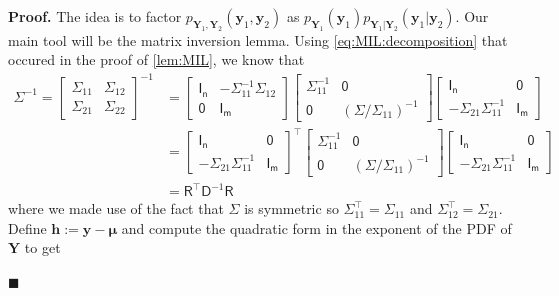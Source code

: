 \documentclass[10pt]{article}
\theoremstyle{definition}
\newenvironment{prf}{\noindent\textbf{Proof.}}{\hfill$\blacksquare$}
\begin{document}
\begin{prf}
The idea is to factor $p_{\mathbf{Y}_1,\mathbf{Y}_2}(\mathbf{y}_1,\mathbf{y}_2)$ as $p_{\mathbf{Y}_1}(\mathbf{y}_1)p_{\mathbf{Y}_1|\mathbf{Y}_2}(\mathbf{y}_1|\mathbf{y}_2)$. Our main tool will be the matrix inversion lemma. Using \cref{eq:MIL:decomposition} that occured in the proof of \cref{lem:MIL}, we know that
\begin{align*}
\mathsf{\Sigma}^{-1} =
\begin{bmatrix}
\mathsf{\Sigma}_{11} & \mathsf{\Sigma}_{12} \\
\mathsf{\Sigma}_{21} & \mathsf{\Sigma}_{22}
\end{bmatrix}^{-1}
&=
\begin{bmatrix}
\mathsf{I_n} & -\mathsf{\Sigma}_{11}^{-1}\mathsf{\Sigma}_{12} \\
\mathsf{0} & \mathsf{I_m}
\end{bmatrix}
\begin{bmatrix}
\mathsf{\Sigma}_{11}^{-1} & \mathsf{0} \\
\mathsf{0} & (\mathsf{\Sigma}/\mathsf{\Sigma}_{11})^{-1}
\end{bmatrix}
\begin{bmatrix}
\mathsf{I_n} & \mathsf{0} \\
-\mathsf{\Sigma}_{21}\mathsf{\Sigma}_{11}^{-1} & \mathsf{I_m}
\end{bmatrix} \\ 
&=
\begin{bmatrix}
\mathsf{I_n} & \mathsf{0} \\
-\mathsf{\Sigma}_{21}\mathsf{\Sigma}_{11}^{-1} & \mathsf{I_m}
\end{bmatrix}^{\top}
\begin{bmatrix}
\mathsf{\Sigma}_{11}^{-1} & \mathsf{0} \\
\mathsf{0} & (\mathsf{\Sigma}/\mathsf{\Sigma}_{11})^{-1}
\end{bmatrix}
\begin{bmatrix}
\mathsf{I_n} & \mathsf{0} \\
-\mathsf{\Sigma}_{21}\mathsf{\Sigma}_{11}^{-1} & \mathsf{I_m}
\end{bmatrix} \\
&= \mathsf{R}^{\top}\mathsf{D}^{-1}\mathsf{R}
\end{align*}
where we made use of the fact that $\mathsf{\Sigma}$ is symmetric so $\mathsf{\Sigma}_{11}^{\top}=\mathsf{\Sigma}_{11}$ and $\mathsf{\Sigma}_{12}^{\top} = \mathsf{\Sigma}_{21}$. Define $\mathbf{h}:=\mathbf{y}-\boldsymbol{\mu}$ and compute the quadratic form in the exponent of the PDF of $\mathbf{Y}$  to get

\end{prf}
\end{document}
